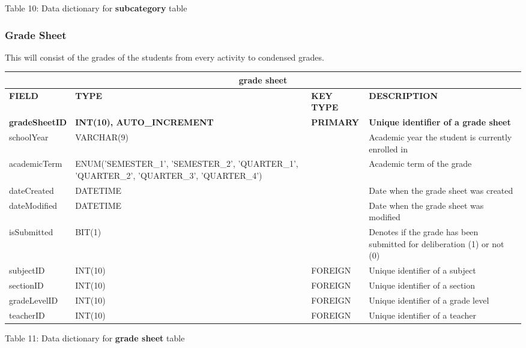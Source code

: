 \documentclass[11pt,a4paper,titlepage]{article}
\begin{document}
\vspace{.5cm}
\begin{center}
    Table 10: Data dictionary for \textbf{subcategory} table
\end{center}


\subsubsection{Grade Sheet}

This will consist of the grades of the students from every activity to condensed grades.

\vspace{1cm}
\begin{longtable}{ |p{2.5cm}|p{4.5cm}|p{2.5cm}|p{3cm}|  }
    \hline
    \multicolumn{4}{|c|}{\textbf{grade sheet}} \\
    \hline
    \textbf{FIELD}&\textbf{TYPE}&\textbf{KEY TYPE}&\textbf{DESCRIPTION}\\
    \hline
    \textbf{gradeSheetID}  & \textbf{INT(10), AUTO\_INCREMENT} & \textbf{PRIMARY} & \textbf{Unique identifier of a grade sheet}\\ \hline
    schoolYear   & VARCHAR(9)   & & Academic year the student is currently enrolled in\\ \hline
    academicTerm   & ENUM('SEMESTER\_1', 'SEMESTER\_2', 'QUARTER\_1', 'QUARTER\_2', 'QUARTER\_3', 'QUARTER\_4') &  & Academic term of the grade\\ \hline
    dateCreated   & DATETIME   & & Date when the grade sheet was created\\ \hline
    dateModified  & DATETIME   & & Date when the grade sheet was modified\\ \hline
    isSubmitted   & BIT(1)   & & Denotes if the grade has been submitted for deliberation (1) or not (0)\\ \hline
    subjectID   & INT(10)   & FOREIGN & Unique identifier of a subject\\ \hline
    sectionID   & INT(10)   & FOREIGN & Unique identifier of a section\\ \hline
    gradeLevelID   & INT(10)   & FOREIGN & Unique identifier of a grade level\\ \hline
    teacherID   & INT(10)   & FOREIGN & Unique identifier of a teacher\\ \hline
\end{longtable}
    
\vspace{.5cm}
\begin{center}
    Table 11: Data dictionary for \textbf{grade sheet} table
\end{center}
\end{document}
